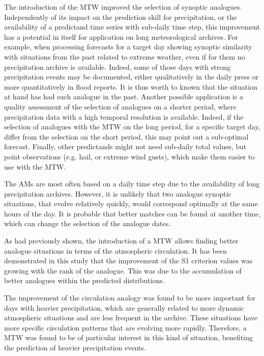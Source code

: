 \documentclass[hess, manuscript]{copernicus}
\begin{document}
	The introduction of the MTW improved the selection of synoptic analogues. Independently of its impact on the prediction skill for precipitation, or the availability of a predictand time series with sub-daily time step, this improvement has a potential in itself for application on long meteorological archives. For example, when processing forecasts for a target day showing synoptic similarity with situations from the past related to extreme weather, even if for them no precipitation archive is available. Indeed, some of those days with strong precipitation events may be documented, either qualitatively in the daily press or more quantitatively in flood reports. It is thus worth to known that the situation at hand has had such analogue in the past. Another possible application is a quality assessment of the selection of analogues on a shorter period, where precipitation data with a high temporal resolution is available. Indeed, if the selection of analogues with the MTW on the long period, for a specific target day, differ from the selection on the short period, this may point out a sub-optimal forecast. Finally, other predictands might not need sub-daily total values, but point observations (e.g. hail, or extreme wind gusts), which make them easier to use with the MTW.
	
	
	
	
	
	
	
	\conclusions  %
	\label{sec:conclusions}
	
	The AMs are most often based on a daily time step due to the availability of long precipitation archives. However, it is unlikely that two analogue synoptic situations, that evolve relatively quickly, would correspond optimally at the same hours of the day. It is probable that better matches can be found at another time, which can change the selection of the analogue dates.
	
	As \citet{Finet2008} had previously shown, the introduction of a MTW allows finding better analogue situations in terms of the atmospheric circulation. It has been demonstrated in this study that the improvement of the S1 criterion values was growing with the rank of the analogue. This was due to the accumulation of better analogues within the predicted distributions.
	
	The improvement of the circulation analogy was found to be more important for days with heavier precipitation, which are generally related to more dynamic atmospheric situations and are less frequent in the archive. These situations have more specific circulation patterns that are evolving more rapidly. Therefore, a MTW was found to be of particular interest in this kind of situation, benefiting the prediction of heavier precipitation events.
	
\end{document}

